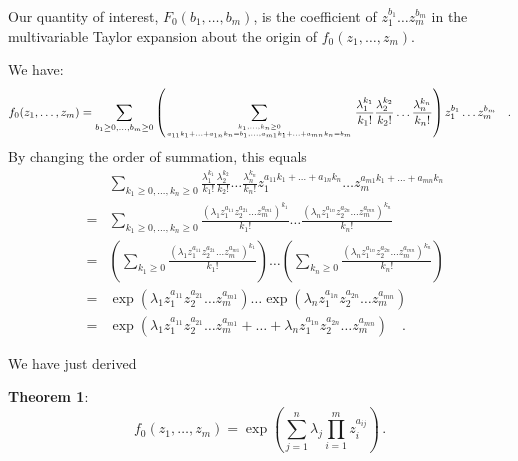 \documentclass[11pt]{article}
\newcommand{\beqn}{\begin{eqnarray*}}
\newcommand{\eeqn}{\end{eqnarray*}}
\newcommand{\atopnew}[2]{\genfrac{}{}{0pt}{}{#1}{#2}}
\begin{document}
Our quantity of interest, $F_0(b_1, \ldots , b_m)$,
is the coefficient of $z_1^{b_1} \ldots  z_m^{b_m}$ in the multivariable
Taylor expansion about the origin of $f_0(z_1, \ldots , z_m)$.

We have:
\[
f_0(z_1, \ldots , z_m)
=\sum_{b_1 \geq 0, \ldots , b_m \geq 0} 
\left (
\sum_{
\atopnew{k_1, \ldots , k_n \geq 0}%
{a_{11} k_1 + \ldots  + a_{1n} k_n=b_1 , \ldots  , 
a_{m1} k_1 + \ldots  + a_{mn} k_n=b_m}
}
\frac{\lambda _1^{k_1}}{k_1!}\frac{\lambda _2^{k_2}}{k_2!} \ldots   
\frac{\lambda _n^{k_n}}{k_n!}
\right )
z_1^{b_1} \ldots  z_m^{b_m} \quad .
\]
By changing the order of summation, this equals
\beqn
&& \!\!\!\!\!\!\!\!\!\!\!\!\!\!\!\!\!\!\!\!
\sum_{k_1 \geq 0, \ldots , k_n \geq 0}
\frac{\lambda _1^{k_1}}{k_1!}\frac{\lambda _2^{k_2}}{k_2!} \ldots   \frac{\lambda _n^{k_n}}{k_n!}
z_1^{a_{11}k_1+ \ldots  + a_{1n} k_n} \ldots  z_m^{a_{m1} k_1 + \ldots  + a_{mn} k_n}
\\
&=&\sum_{k_1 \geq 0, \ldots , k_n \geq 0} 
\frac{(\lambda _1 z_1^{a_{11}} z_2^{a_{21}} \ldots  z_m^{a_{m1}})^{k_1}}{k_1!}
\ldots 
\frac{(\lambda _n z_1^{a_{1n}} z_2^{a_{2n}} \ldots  z_m^{a_{mn}})^{k_n}}{k_n!}
\\
&=&
\left ( \sum_{k_1 \geq 0}  \frac{(\lambda _1 z_1^{a_{11}} z_2^{a_{21}} \ldots  z_m^{a_{m1}})^{k_1}}{k_1!} \right )
\ldots 
\left ( \sum_{k_n \geq 0}  \frac{(\lambda _n z_1^{a_{1n}} z_2^{a_{2n}} \ldots  z_m^{a_{mn}})^{k_n}}{k_n!} \right )
\\
&=&\exp ( \lambda _1 z_1^{a_{11}} z_2^{a_{21}} \ldots  z_m^{a_{m1}} )
\ldots 
\exp ( \lambda _n z_1^{a_{1n}} z_2^{a_{2n}} \ldots  z_m^{a_{mn}} )
\\
&=&\exp \left ( \lambda _1 z_1^{a_{11}} z_2^{a_{21}} \ldots  z_m^{a_{m1}} + \ldots  +
\lambda _n z_1^{a_{1n}} z_2^{a_{2n}} \ldots  z_m^{a_{mn}} \right ) \quad .
\eeqn

We have just derived

{\bf Theorem 1}: 
\[
f_0(z_1, \ldots , z_m)= 
\exp \left ( 
\sum_{j=1}^{n} \lambda _j \prod_{i=1}^{m} z_i^{a_{ij}} 
\right )\,.
\]
\end{document}
